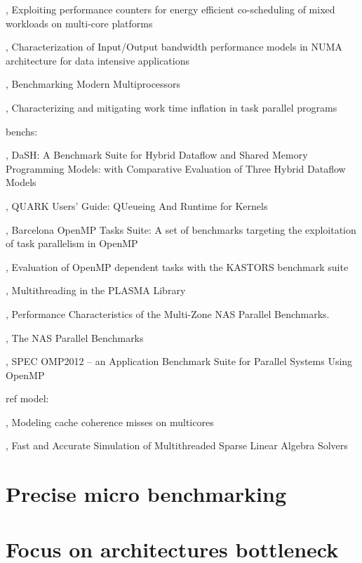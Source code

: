\cite{Libutti2014}, Exploiting performance counters for energy efficient co-scheduling of mixed workloads on multi-core platforms

\cite{Li2013}, Characterization of Input/Output bandwidth performance models in NUMA architecture for data intensive applications

\cite{Bienia2011}, Benchmarking Modern Multiprocessors

\cite{Olivier2013}, Characterizing and mitigating work time inflation in task parallel programs

benchs:

\cite{Gajinov2014}, DaSH: A Benchmark Suite for Hybrid Dataflow and Shared Memory Programming Models: with Comparative Evaluation of Three Hybrid Dataflow Models

\cite{YarKhan2011}, QUARK Users' Guide: QUeueing And Runtime for Kernels

\cite{Duran2009}, Barcelona OpenMP Tasks Suite: A set of benchmarks targeting the exploitation of task parallelism in OpenMP

\cite{Virouleau2014}, Evaluation of OpenMP dependent tasks with the KASTORS benchmark suite

\cite{Kurzak2013}, Multithreading in the PLASMA Library

\cite{Jin2004}, Performance Characteristics of the Multi-Zone NAS Parallel Benchmarks.

\cite{Bailey1994}, The NAS Parallel Benchmarks

\cite{Muller2012}, SPEC OMP2012 -- an Application Benchmark Suite for Parallel Systems Using OpenMP


ref model:

\cite{Pan2014}, Modeling cache coherence misses on multicores

\cite{Stanisic2016}, Fast and Accurate Simulation of Multithreaded Sparse Linear Algebra Solvers



\section{Precise micro benchmarking}
\section{Focus on architectures bottleneck}
